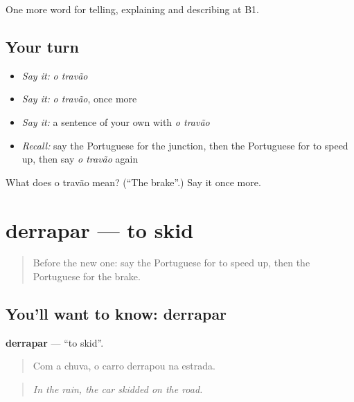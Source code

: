 \begin{grammarlens}[title={What you've built}]
One more word for telling, explaining and describing at B1.
\end{grammarlens}

\subsection*{Your turn}
\begin{itemize}
\raggedright
  \item \emph{Say it:} \emph{o travão}
  \item \emph{Say it:} \emph{o travão}, once more
  \item \emph{Say it:} a sentence of your own with \emph{o travão}
  \item \emph{Recall:} say the Portuguese for the junction, then the Portuguese for to speed up, then say \emph{o travão} again
\end{itemize}

\begin{tcolorbox}[breakable,colback=teal!4,colframe=teal!35!black,title={Before you move on}]
What does o travão mean? (\textquotedblleft{}The brake\textquotedblright{}.) Say it once more.
\end{tcolorbox}
\section[derrapar]{derrapar — to skid}

\label{lesson:PT-C402-derrapar}



\begin{quote}
Before the new one: say the Portuguese for to speed up, then the Portuguese for the brake.
\end{quote}

\subsection*{You'll want to know: derrapar}
\textbf{derrapar} — \textquotedblleft{}to skid\textquotedblright{}.

\begin{quote}
Com a chuva, o carro derrapou na estrada.
\end{quote}

\begin{quote}
\emph{In the rain, the car skidded on the road.}
\end{quote}

